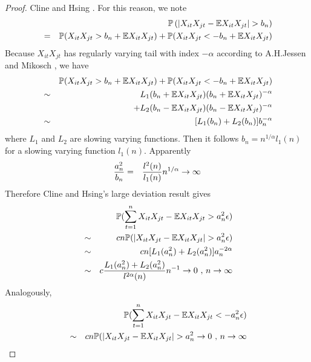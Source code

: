 \documentclass{article}
\begin{document}
\begin{proof}
  Cline and Hsing \cite{ClingHsing1998}. For this reason, we note
  \begin{eqnarray*}
    && \mathbb{P}\left(
    |X_{it} X_{jt} - \mathbb{E} X_{it} X_{jt}| > b_n
  \right) \\
  &=& \mathbb{P}(X_{it} X_{jt} > b_n + \mathbb{E} X_{it} X_{jt}) + \mathbb{P}(X_{it} X_{jt} <
  -b_n + \mathbb{E} X_{it} X_{jt})
  \end{eqnarray*}
  Because $X_{it} X_{jt}$ has regularly varying tail with index
  $-\alpha$ according to A.H.Jessen and Mikosch
  \cite{JessenMikosch2006}, we have
  \begin{eqnarray*}
    && \mathbb{P}(X_{it} X_{jt} > b_n + \mathbb{E} X_{it} X_{jt}) + \mathbb{P}(X_{it} X_{jt} <
    -b_n + \mathbb{E} X_{it} X_{jt}) \\
    &\sim& L_1(b_n + \mathbb{E} X_{it} X_{jt}) (b_n + \mathbb{E} X_{it}
    X_{jt})^{-\alpha} \\
    && +L_2(b_n - \mathbb{E} X_{it} X_{jt}) (b_n - \mathbb{E} X_{it}
    X_{jt})^{-\alpha} \\
    &\sim& [L_1(b_n) + L_2(b_n)] b_n^{-\alpha}
  \end{eqnarray*}
  where $L_1$ and $L_2$ are slowing varying functions. Then it follows
  $b_n = n^{1/\alpha} l_1(n)$ for a slowing varying function
  $l_1(n)$. Apparently
  \begin{eqnarray*}
    {a_n^2 \over b_n} &=& {l^2(n) \over l_1(n)} n^{1/\alpha} \to \infty
  \end{eqnarray*}
  Therefore Cline and Hsing's large deviation result
  \cite{ClingHsing1998} gives
  \begin{eqnarray}
    && \mathbb{P}(\sum_{t=1}^n X_{it} X_{jt} - \mathbb{E} X_{it} X_{jt} > a_n^2
    \epsilon) \nonumber \\
    &\sim& c n \mathbb{P}(|X_{it} X_{jt} - \mathbb{E} X_{it} X_{jt}| > a_n^2
    \epsilon) \nonumber \\
    &\sim& cn [L_1(a_n^2) + L_2(a_n^2)] a_n^{-2\alpha} \nonumber \\
    &\sim& c {L_1(a_n^2) + L_2(a_n^2) \over l^{2\alpha}(n)} n^{-1}
    \to 0 \text{ , }n \to \infty \label{eq:B3}
  \end{eqnarray}
  Analogously,
  \begin{eqnarray}
    && \mathbb{P}(\sum_{t=1}^n X_{it} X_{jt} - \mathbb{E} X_{it} X_{jt} < -a_n^2
    \epsilon) \nonumber \\
    &\sim& c n \mathbb{P}(|X_{it} X_{jt} - \mathbb{E} X_{it} X_{jt}| > a_n^2 \to 0
    \text{ , }n \to \infty \label{eq:B4}
  \end{eqnarray}

\end{proof}
\end{document}
